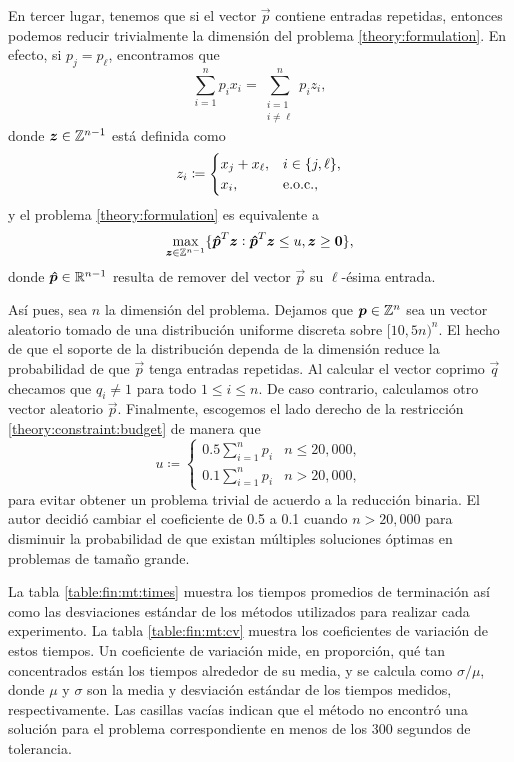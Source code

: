 En tercer lugar, tenemos que si el vector $\vec{p}$ contiene entradas repetidas, entonces podemos
reducir trivialmente la dimensión del problema \eqref{theory:formulation}. En efecto, si $p_j =
p_\ell$, encontramos que
\begin{equation*}
	\sum_{i = 1}^{n}p_ix_i = \sum_{\substack{i = 1 \\ i \neq \ell}}^{n}p_iz_i,
\end{equation*}
donde $\boldsymbol{z} \in \mathbb{Z}^{n-1}$ está definida como
\begin{equation*}
	z_i \coloneq \begin{cases}
		x_j + x_\ell, & i \in \lbrace j, \ell \rbrace, \\
		x_i, & \text{e.o.c.},
	\end{cases}
\end{equation*}
y el problema \eqref{theory:formulation} es equivalente a
\begin{equation*}
	\max_{\boldsymbol{z} \in \mathbb{Z}^{n-1}} \lbrace \boldsymbol{\hat{p}}^T\boldsymbol{z} \vcentcolon \boldsymbol{\hat{p}}^T\boldsymbol{z} \leq u,
	\boldsymbol{z} \geq \boldsymbol{0} \rbrace,
\end{equation*}
donde $\boldsymbol{\hat{p}} \in \mathbb{R}^{n-1}$ resulta de remover del vector $\vec{p}$ su $\ell$-ésima entrada.

Así pues, sea $n$ la dimensión del problema. Dejamos que $\boldsymbol{p} \in \mathbb{Z}^n$ sea un vector aleatorio
tomado de una distribución uniforme discreta sobre $[10, 5n)^n$. El hecho de que el soporte de la
distribución dependa de la dimensión reduce la probabilidad de que $\vec{p}$ tenga entradas
repetidas. Al calcular el vector coprimo $\vec{q}$ checamos que $q_i \neq 1$ para todo $1 \leq i
\leq n$. De caso contrario, calculamos otro vector aleatorio $\vec{p}$. Finalmente, escogemos el
lado derecho de la restricción \eqref{theory:constraint:budget} de manera que
\begin{equation*}
	u \coloneq \begin{cases}
		0.5\sum_{i=1}^{n}p_i & n \leq 20{,}000, \\
		0.1\sum_{i=1}^{n}p_i & n > 20{,}000,
	\end{cases}
\end{equation*}
para evitar obtener un problema trivial de acuerdo a la reducción binaria. El autor decidió cambiar
el coeficiente de 0.5 a 0.1 cuando $n > 20{,}000$ para disminuir la probabilidad de que existan
múltiples soluciones óptimas en problemas de tamaño grande.

La tabla \ref{table:fin:mt:times} muestra los tiempos promedios de terminación así como las
desviaciones estándar de los métodos utilizados para realizar cada experimento. La tabla
\ref{table:fin:mt:cv} muestra los coeficientes de variación de estos tiempos. Un coeficiente de
variación mide, en proporción, qué tan concentrados están los tiempos alrededor de su media, y se
calcula como $\sigma / \mu$, donde $\mu$ y $\sigma$ son la media y desviación estándar de los tiempos
medidos, respectivamente. Las casillas vacías indican que el método no encontró una solución para el
problema correspondiente en menos de los 300 segundos de tolerancia.

